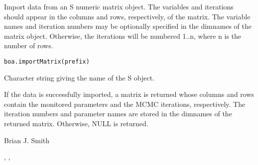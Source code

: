 \begin{Description}\relax
Import data from an S numeric matrix object. The variables and iterations
should appear in the columns and rows, respectively, of the matrix. The
variable names and iteration numbers may be optionally specified in the
dimnames of the matrix object.  Otherwise, the iterations will be numbered 
1..n, where n is the number of rows.
\end{Description}
\begin{Usage}
\begin{verbatim}
boa.importMatrix(prefix)
\end{verbatim}
\end{Usage}
\begin{Arguments}
\begin{ldescription}
\item[\code{prefix}] Character string giving the name of the S object.
\end{ldescription}
\end{Arguments}
\begin{Value}
If the data is successfully imported, a matrix is returned whose columns and
rows contain the monitored parameters and the MCMC iterations, respectively.
The iteration numbers and parameter names are stored in the dimnames of the 
returned matrix. Otherwise, NULL is returned.
\end{Value}
\begin{Author}\relax
Brian J. Smith
\end{Author}
\begin{SeeAlso}\relax
{}, ,
\end{SeeAlso}

